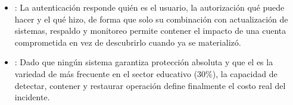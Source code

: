 \begin{itemize}
  \item {}: La autenticación responde quién es el usuario, la autorización qué puede hacer y el  qué hizo, de forma que solo su combinación con actualización de sistemas, respaldo y monitoreo permite contener el impacto de una cuenta comprometida en vez de descubrirlo cuando ya se materializó.
  \item {}: Dado que ningún sistema garantiza protección absoluta y que el  es la variedad de más frecuente en el sector educativo (30\%), la capacidad de detectar, contener y restaurar operación define finalmente el costo real del incidente.
\end{itemize}
